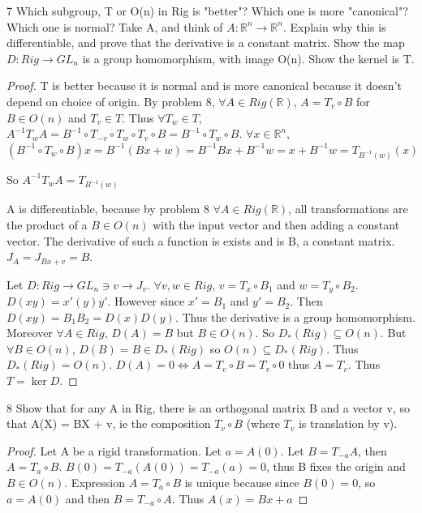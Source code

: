 \documentclass{article}
\newcommand{\R}{\mathbb{R}}
\begin{document}
\begin{PROB}{7}\label{Problem 7.}
    Which subgroup, T or O(n) in Rig is "better"? Which one is more "canonical"? Which one is normal?  Take A, and think of $A: \R^n \to \R^n$. Explain why this is differentiable, and prove that the derivative is a constant matrix. Show the map $D:  Rig \to GL_n$ is a group homomorphism, with image O(n). Show the kernel is T. 
\end{PROB}
\begin{proof}
    T is better because it is normal and is more canonical because it doesn't depend on choice of origin. By problem 8, $\forall A \in Rig(\R)$, $A = T_v \circ B$ for $B \in O(n)$ and $T_v \in T$. Thus $\forall T_w \in T$, $A^{-1} T_w A = B^{-1} \circ T_{-v} \circ T_w \circ  T_v \circ B = B^{-1} \circ T_w \circ B$. $\forall x \in \R^n$, $(B^{-1} \circ T_w \circ B)x = B^{-1}(Bx + w) = B^{-1}Bx + B^{-1}w = x + B^{-1}w =  T_{B^{-1}(w)}(x)$

    So $A^{-1}T_wA = T_{B^{-1}(w)}$

    A is differentiable, because by problem 8 $\forall A \in Rig(\R)$, all transformations are the product of a $B \in O(n)$ with the input vector and then adding a constant vector. The derivative of such a function is exists and is B, a constant matrix. $J_A = J_{Bx + v} = B$. 

    Let $D: Rig \to GL_n \ni v \to J_v$. $\forall v, w \in Rig$, $v = T_x \circ B_1$ and $w = T_y \circ B_2$. $D(xy)= x'(y)y'$. However since $x' = B_1$ and $y' = B_2$. Then $D(xy) = B_1B_2 = D(x)D(y)$. Thus the derivative is a group homomorphism. Moreover $\forall A \in Rig$, $D(A) = B$ but $B \in O(n)$. So $D_*(Rig) \subseteq O(n)$. But $\forall B \in O(n)$, $D(B) = B \in D_*(Rig)$ so $O(n) \subseteq D_*(Rig)$. Thus $D_*(Rig) = O(n)$. $D(A) = 0 \iff A = T_v \circ B = T_v \circ 0$ thus $A = T_v$. Thus $T = \ker D$.
\end{proof}

\bigskip

\begin{PROB}{8}\label{Problem 8.}
    Show that for any A in Rig, there is an orthogonal matrix B and a vector v, so that A(X) = BX + v, ie the composition  $T_v \circ B$ (where $T_v$ is translation by v).
\end{PROB}
\begin{proof}
    Let A be a rigid transformation. Let $a = A(0)$. Let $B = T_{-a}A$, then $A = T_{a}\circ B$. $B(0) = T_{-a}(A(0)) = T_{-a}(a) = 0$, thus B fixes the origin and $B \in O(n)$. Expression $A = T_{a} \circ B$ is unique because since $B(0) = 0$, so $a = A(0)$ and then $B = T_{-a} \circ A$. Thus $A(x) = Bx + a$

\end{proof}
\end{document}
